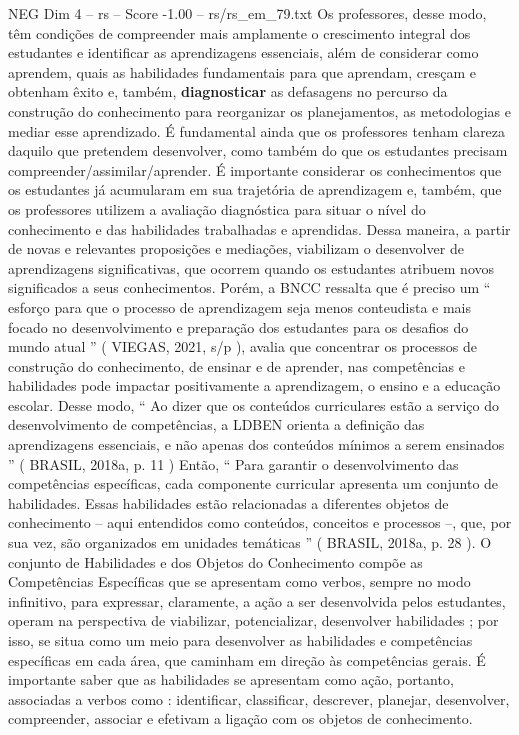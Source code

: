 \begin{textsample}{NEG Dim 4 – rs – Score -1.00 – rs/rs\_em\_79.txt}
Os professores, desse modo, têm condições de compreender mais amplamente o crescimento integral dos estudantes e identificar as aprendizagens essenciais, além de considerar como aprendem, quais as habilidades fundamentais para que aprendam, cresçam e obtenham êxito e, também, \textbf{diagnosticar} as defasagens no percurso da construção do conhecimento para reorganizar os planejamentos, as metodologias e mediar esse aprendizado.
É fundamental ainda que os professores tenham clareza daquilo que pretendem desenvolver, como também do que os estudantes precisam compreender/assimilar/aprender.
É importante considerar os conhecimentos que os estudantes já acumularam em sua trajetória de aprendizagem e, também, que os professores utilizem a avaliação diagnóstica para situar o nível do conhecimento e das habilidades trabalhadas e aprendidas.
Dessa maneira, a partir de novas e relevantes proposições e mediações, viabilizam o desenvolver de aprendizagens significativas, que ocorrem quando os estudantes atribuem novos significados a seus conhecimentos.
Porém, a BNCC ressalta que é preciso um “ esforço para que o processo de aprendizagem seja menos conteudista e mais focado no desenvolvimento e preparação dos estudantes para os desafios do mundo atual ” ( VIEGAS, 2021, s/p ), avalia que concentrar os processos de construção do conhecimento, de ensinar e de aprender, nas competências e habilidades pode impactar positivamente a aprendizagem, o ensino e a educação escolar.
Desse modo, “ Ao dizer que os conteúdos curriculares estão a serviço do desenvolvimento de competências, a LDBEN orienta a definição das aprendizagens essenciais, e não apenas dos conteúdos mínimos a serem ensinados ” ( BRASIL, 2018a, p. 11 ) Então, “ Para garantir o desenvolvimento das competências específicas, cada componente curricular apresenta um conjunto de habilidades.
Essas habilidades estão relacionadas a diferentes objetos de conhecimento – aqui entendidos como conteúdos, conceitos e processos –, que, por sua vez, são organizados em unidades temáticas ” ( BRASIL, 2018a, p. 28 ).
O conjunto de Habilidades e dos Objetos do Conhecimento compõe as Competências Específicas que se apresentam como verbos, sempre no modo infinitivo, para expressar, claramente, a ação a ser desenvolvida pelos estudantes, operam na perspectiva de viabilizar, potencializar, desenvolver habilidades ; por isso, se situa como um meio para desenvolver as habilidades e competências específicas em cada área, que caminham em direção às competências gerais.
É importante saber que as habilidades se apresentam como ação, portanto, associadas a verbos como : identificar, classificar, descrever, planejar, desenvolver, compreender, associar e efetivam a ligação com os objetos de conhecimento.

\end{textsample}
